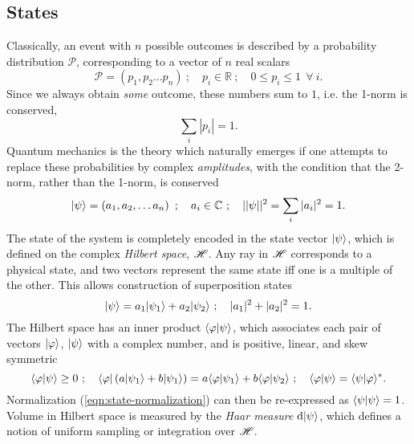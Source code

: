 \subsection{States}
\label{sec:quantum-mechanics-states}
Classically, an event with $n$ possible outcomes is described by a probability distribution $\mathcal{P}$, corresponding to a vector of $n$ real scalars
\begin{equation}
   \mathcal{P} = \left( p_1, p_2 \ldots p_n \right)~;\quad p_i \in \mathbb{R}~;\quad 0\le p_i \le 1~~\forall~i.
\end{equation}
Since we always obtain \emph{some} outcome, these numbers sum to $1$, i.e. the 1-norm is conserved, 
\begin{equation}
\sum_i|p_i|  = 1.
\end{equation}
Quantum mechanics is the theory which naturally emerges if one attempts to replace these probabilities by complex \emph{amplitudes}, with the condition that the 2-norm, rather than the 1-norm, is conserved
\begin{equation}
   \mbox{$ | \psi \rangle $} = \left( a_1 , a_2, \ldots a_n \right) ~; \quad a_i \in \mathbb{C} ~; \quad ||\psi||^2 = \sum_i |a_i|^2 = 1.
   \label{eqn:state-normalization}
\end{equation}
The state of the system is completely encoded in the state vector $\mbox{$ | \psi \rangle $}$, which is defined on the complex \emph{Hilbert space}, $\mathscr{H}$. Any ray in $\mathscr{H}$ corresponds to a physical state, and two vectors represent the same state iff one is a multiple of the other. This allows construction of superposition states
\begin{equation}
    \mbox{$ | \psi \rangle $} = a_1\mbox{$ | \psi_1 \rangle $} + a_2 \mbox{$ | \psi_2 \rangle $} ~;\quad |a_1|^2 + |a_2|^2 = 1.
\end{equation}
The Hilbert space has an inner product $\langle \varphi | \psi \rangle$, which associates each pair of vectors $\mbox{$ | \varphi \rangle $}$, $\mbox{$ | \psi \rangle $}$ with a complex number, and is positive, linear, and skew symmetric
\begin{equation}
   \langle \varphi | \psi \rangle \ge 0 ~; \quad 
   \mbox{$ \langle \varphi | $}\left(a \mbox{$ | \psi_1 \rangle $} + b \mbox{$ | \psi_1 \rangle $}\right) 
   = a \langle \varphi | \psi_1 \rangle + b \langle \varphi | \psi_2 \rangle  ~; \quad 
   \langle \varphi | \psi \rangle = \langle \psi | \varphi \rangle^*.
\end{equation}
Normalization (\ref{eqn:state-normalization}) can then be re-expressed as $\langle \psi | \psi \rangle=1$.
Volume in Hilbert space is measured by the \emph{Haar measure} $\mathrm{d} \mbox{$ | \psi \rangle $}$, which defines a notion of uniform sampling or integration over $\mathscr{H}$. 
